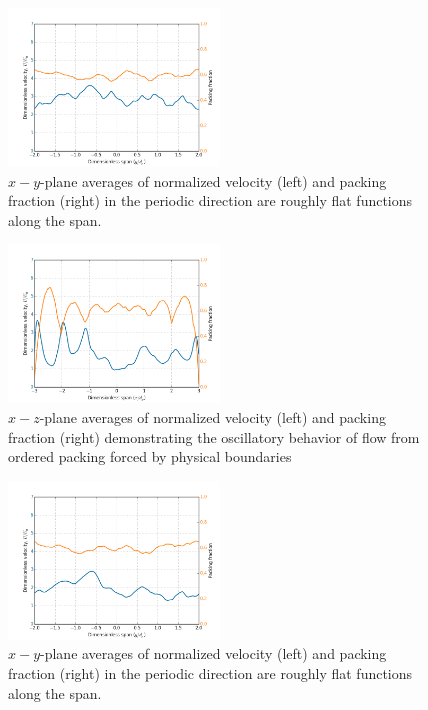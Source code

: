 \begin{figure}[!t]
    \centering
    \includegraphics[width = 0.5\textwidth]{figures/lbm/z-phi-v-profiles-filled.png}
    \caption{$x-y$-plane averages of normalized velocity (left) and packing fraction (right) in the periodic direction are roughly flat functions along the span.}\label{fig:z-phi-v-profiles-filled}
\end{figure}


\begin{figure}[!t]
    \centering
    \includegraphics[width = 0.5\textwidth]{figures/lbm/y-phi-v-profiles-crushed.png}
    \caption{$x-z$-plane averages of normalized velocity (left) and packing fraction (right) demonstrating the oscillatory behavior of flow from ordered packing forced by physical boundaries}\label{fig:y-phi-v-profiles-crushed}
\end{figure}

\begin{figure}[!t]
    \centering
    \includegraphics[width = 0.5\textwidth]{figures/lbm/z-phi-v-profiles-crushed.png}
    \caption{$x-y$-plane averages of normalized velocity (left) and packing fraction (right) in the periodic direction are roughly flat functions along the span.}\label{fig:z-phi-v-profiles-crushed}
\end{figure}